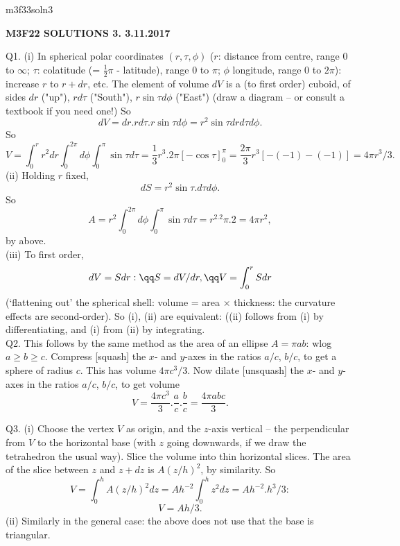 \documentclass[12pt]{article}
\begin{document}
\def\R{\mathbb{R}}
\def\C{\mathbb{C}}
\def\Z{\mathbb{Z}}
\def\N{\mathbb{N}}
\def\Q{\mathbb{Q}}
\def\D{\mathbb{D}}
\def\Sp{{\mathbb{S}}}
\def\T{\mathbb{T}}
\def\H{\mathbb{H}}
\def\hb{\hfil \break}
\def\ni{\noindent}
\def\i{\indent}
\def\a{\alpha}
\def\b{\beta}
\def\e{\epsilon}
\def\d{\delta}
\def\D{\Delta}
\def\G{\Gamma}
\def\g{\gamma}
\def\l{\lambda}
\def\m{\mu}
\def\s{\sigma}
\def\Si{\Sigma}
\def\th{\theta}
\def\z{\zeta}
\def\p{\partial}
\def\o{\omega}
\def\O{\Omega}
\def\t{\tau}
\def\L{\it \char'44}
\def\F{\mathcal{F}}
\def\B{\mathcal{B}}
\def\C{\mathcal{C}}
\def\half{\frac{1}{2}}
\ni m3f33soln3 \\
\begin{center}
{\bf M3F22 SOLUTIONS 3.  3.11.2017} 
\end{center}

\ni Q1. (i) In spherical polar coordinates $(r, \t, \phi)$ ($r$: distance from centre, range $0$ to $\infty$; $\t$: colatitude (= $\half \pi$ - latitude), range 0 to $\pi$; $\phi$ longitude, range 0 to $2 \pi$): increase $r$ to $r + dr$, etc.  The element of volume $dV$ is a (to first order) cuboid, of sides $dr$ ("up"), $r d \t$ ("South"), $r \sin \t d \phi$ ("East") (draw a diagram -- or consult a textbook if you need one!)  So
$$
dV = dr.r d \t.r \sin \t d \phi = r^2 \sin \t dr d\t d \phi.
$$
So
$$
V = \int_0^r r^2 dr \int_0^{2 \pi} d \phi \int_0^{\pi} \sin \t d \t
= \frac{1}{3} r^3. 2 \pi [- \cos \t]_0^{\pi} = \frac{2 \pi}{3} r^3 [-(-1) - (-1)] = 4 \pi r^3/3.
$$
(ii) Holding $r$ fixed,
$$
dS = r^2 \sin \t.d\t d \phi.
$$
So
$$
A = r^2 \int_0^{2 \pi} d \phi \int_0^{\pi} \sin \t d \t = r^2.2 \pi. 2 = 4 \pi r^2,
$$
by above. \\
(iii)  To first order,
$$
dV = S dr: \qq S = dV/dr, \qq V = \int_0^r S dr
$$
(`flattening out' the spherical shell: volume = area $\times$ thickness: the curvature effects are second-order).  So (i), (ii) are equivalent: ((ii) follows from (i) by differentiating, and (i) from (ii) by integrating. \\

\ni Q2.  This follows by the same method as the area of an ellipse $A = \pi ab$: wlog $a \geq b \geq c$.  Compress [squash] the $x$- and $y$-axes in the ratios $a/c$, $b/c$, to get a sphere of radius $c$.  This has volume $4 \pi c^3/3$.  Now dilate [unsquash] the $x$- and $y$-axes in the ratios $a/c$, $b/c$, to get volume
$$
V = \frac{4 \pi c^3}{3}.\frac{a}{c}.\frac{b}{c} = \frac{4 \pi abc}{3}.
$$

Q3. (i) Choose the vertex $V$ as origin, and the $z$-axis vertical -- the perpendicular from $V$ to the horizontal base (with $z$ going downwards, if we draw the tetrahedron the usual way).  Slice the volume into thin horizontal slices.  The area of the slice between $z$ and $z + dz$ is $A (z/h)^2$, by similarity.  So
$$
V = \int_0^h A (z/h)^2 dz = A h^{-2} \int_0^h z^2 dz = A h^{-2}.h^3/3:
$$
$$
V = Ah/3.
$$
(ii) Similarly in the general case: the above does not use that the base is triangular. \\
\end{document}
